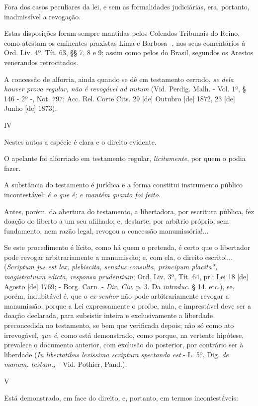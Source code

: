 Fora dos casos peculiares da lei, e sem as formalidades judiciárias,
era, portanto, inadmissível a revogação.

Estas disposições foram sempre mantidas pelos Colendos Tribunais do
Reino, como atestam os eminentes praxistas Lima e Barbosa -, nos seus
comentários à Ord. Liv. 4º, Tít. 63, §§ 7, 8 e 9; assim como pelos do
Brasil, segundos os Arestos venerandos retrocitados.

A concessão de alforria, ainda quando se dê em testamento cerrado,
\emph{se dela houver prova regular, não é revogável ad nutum} (Vid.
Perdig. Malh. - Vol. 1º, § 146 - 2º -, Not. 797; Acc. Rel. Corte Cits.
29 {[}de{]} Outubro {[}de{]} 1872, 23 {[}de{]} Junho {[}de{]} 1873).

IV

Nestes autos a espécie é clara e o direito evidente.

O apelante foi alforriado em testamento regular, \emph{licitamente}, por
quem o podia fazer\emph{.}

A substância do testamento é jurídica e a forma constitui instrumento
público incontestável: \emph{é o que é; e mantém quanto foi feito}.

Antes, porém, da abertura do testamento, a libertadora, por escritura
pública, fez doação do liberto a um seu afilhado; e, destarte, por
arbítrio próprio, sem fundamento, nem razão legal, revogou a concessão
manumissória!...

Se este procedimento é lícito, como há quem o pretenda, é certo que o
libertador pode revogar arbitrariamente a manumissão; e, com ela, o
direito escrito!... (\emph{Scriptum jus est lex, plebiscita, senatus
consulta, principum placita*, magistratuum edicta, responsa prudentium};
Ord. Liv. 3º, Tít. 64, pr.; Lei 18 {[}de{]} Agosto {[}de{]} 1769; -
Borg. Carn. - \emph{Dir. Civ.} p. 3. Da \emph{introduc.} § 14, etc.),
se, porém, indubitável é, que o \emph{ex-senhor} não pode
arbitrariamente revogar a manumissão, porque a Lei expressamente o
proíbe, nula, e imprestável deve ser a doação declarada, para subsistir
inteira e exclusivamente a liberdade preconcedida no testamento, se bem
que verificada depois; não só como ato irrevogável, \emph{que é}, como
está demonstrado, como porque, na vertente hipótese, prevalece o
documento anterior, com exclusão do posterior, por contrário ser à
liberdade (\emph{In libertatibus levissima scriptura spectanda est} - L.
5º, Dig. \emph{de manum. testam.; -} Vid. Pothier, Pand.).

V

Está demonstrado, em face do direito, e, portanto, em termos
incontestáveis:

